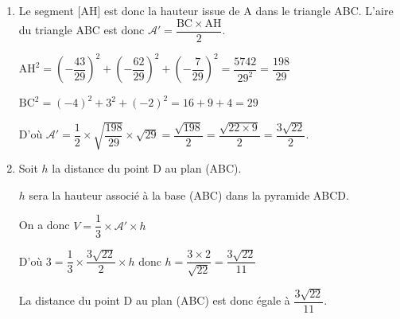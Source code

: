 \documentclass[10pt]{article}
\providecommand{\vectt}[1]{\overrightarrow{\mathrm{#1}}}
\begin{document}
\begin{enumerate}
\begin{itemize}
On a $\vectt{BC} \begin{pmatrix} -4 \\3 \\ -2 \end{pmatrix}$ et $\vectt{\text{AX}} \begin{pmatrix} -\frac{43}{29} \\ -\frac{62}{29} \\ \frac{-7}{29} \end{pmatrix}$ 

Le repère étant orthonormé on peut calculer le produit scalaire :

$\vectt{\text{AX}} \cdot \vectt{\text{BC}} =  \dfrac{172}{29} - \dfrac{186}{29}+ \dfrac{14}{29} = \dfrac{186}{29} - \dfrac{186}{29} = 0$ donc les vecteurs $\vectt{\text{AX}}$ et $\vectt{\text{BC}}$ sont orthogonaux.

D'autre part $\vectt{\text{BX}} = \begin{pmatrix} -\dfrac{72}{29} \\\dfrac{54}{29}\\ -\dfrac{72}{29} \end{pmatrix}$ et on constate que $\vectt{\text{BX}} = \dfrac{18}{29}\vectt{\text{BC}}$.

Conclusion les vecteurs $\vectt{\text{BX}}$ et $\vectt{\text{BC}}$ sont colinéaires ou encore X appartient à la droite (BC).

X est donc le projeté orthogonal de A sur (BC) ; les coordonnées de H sont bien $\left(\dfrac{73}{29}~;~\dfrac{- 4}{29}~;~\dfrac{21}{29} \right)$.
\end{itemize}

Donc le point H est le projeté orthogonal du point A sur la droite (BC).
	\item Le segment [AH] est donc la hauteur issue de A dans le triangle ABC. 
L'aire du triangle ABC est  donc $\mathcal{A}'= \dfrac{\mathrm{BC} \times \mathrm{AH}}{2}$.

$\mathrm{AH}^2 =  \left(-\dfrac{43}{29} \right)^2 + \left(-\dfrac{62}{29}\right)^2 +  \left(-\dfrac{7}{29}\right) ^2 = \dfrac{5742}{29^2} = \dfrac{198}{29} $ 

$\mathrm{BC}^2= (-4)^2+3^2+(-2)^2= 16+9+4=29$

D'où $\mathcal{A}'= \dfrac{ 1}{2} \times \sqrt{\dfrac{198}{29}} \times  \sqrt{29} = \dfrac{\sqrt{198}}{2}=   \dfrac{\sqrt{22 \times 9 }}{2}=\dfrac{3\sqrt{22}}{2}$.

	\item Soit $h$ la distance du point D au plan (ABC). 

$h$ sera la hauteur associé à la base (ABC) dans la pyramide ABCD. 
	
On a donc $V = \dfrac{1}{3} \times \mathcal{A}' \times h$
	
D'où $3 = \dfrac{1}{3} \times  \dfrac{3\sqrt{22}}{2}\times h $ donc $h = \dfrac{3 \times 2}{\sqrt{22}}= \dfrac{3\sqrt{22}}{11}$

La distance du point D au plan (ABC) est donc égale à $\dfrac{3\sqrt{22}}{11}$.
\end{enumerate}

\medskip
\end{document}

